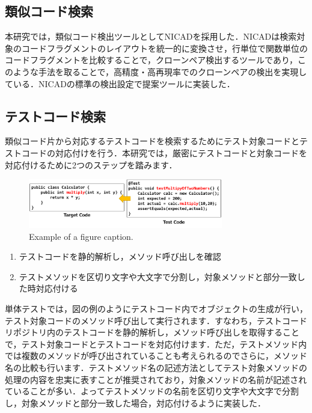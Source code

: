 \documentclass[conference]{IEEEtran}
\begin{document}
\subsection{類似コード検索}
本研究では，類似コード検出ツールとしてNICADを採用した．NICADは検索対象のコードフラグメントのレイアウトを統一的に変換させ，行単位で関数単位のコードフラグメントを比較することで，クローンペア検出するツールであり，このような手法を取ることで，高精度・高再現率でのクローンペアの検出を実現している．NICADの標準の検出設定で提案ツールに実装した．

\subsection{テストコード検索}
類似コード片から対応するテストコードを検索するためにテスト対象コードとテストコードの対応付けを行う．本研究では，厳密にテストコードと対象コードを対応付けるために2つのステップを踏みます．

\begin{figure}[htbp]
\centerline{\includegraphics[width=8.5cm]{mapping.pdf}}
\caption{Example of a figure caption.}
\label{fig}
\end{figure}

\begin{enumerate}
\renewcommand{\labelenumi}{(\arabic{enumi})}
\item テストコードを静的解析し，メソッド呼び出しを確認
\item テストメソッドを区切り文字や大文字で分割し，対象メソッドと部分一致した時対応付ける
\end{enumerate}

単体テストでは，図の例のようにテストコード内でオブジェクトの生成が行い，テスト対象コードのメソッド呼び出して実行されます．すなわち，テストコードリポジトリ内のテストコードを静的解析し，メソッド呼び出しを取得することで，テスト対象コードとテストコードを対応付けます．ただ，テストメソッド内では複数のメソッドが呼び出されていることも考えられるのでさらに，メソッド名の比較も行います．テストメソッド名の記述方法としてテスト対象メソッドの処理の内容を忠実に表すことが推奨されており，対象メソッドの名前が記述されていることが多い．よってテストメソッドの名前を区切り文字や大文字で分割し，対象メソッドと部分一致した場合，対応付けるように実装した．
\end{document}
